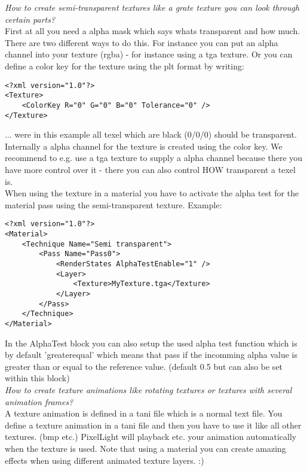 \emph{How to create semi-transparent textures like a grate texture you can look through certain parts?}\\
First at all you need a alpha mask which says whats transparent and how much.
There are two different ways to do this. For instance you can put an alpha channel into your
texture (rgba) - for instance using a tga texture. Or you can define a color key for the texture
using the plt format by writing:\\

\begin{lstlisting}[caption=plt-file color key]
<?xml version="1.0"?>
<Texture>
	<ColorKey R="0" G="0" B="0" Tolerance="0" />
</Texture>
\end{lstlisting}

... were in this example all texel which are black (0/0/0) should be transparent. Internally a
alpha channel for the texture is created using the color key. We recommend to e.g. use a tga
texture to supply a alpha channel because there you have more control over it - there you can
also control HOW transparent a texel is.\\
    
When using the texture in a material you have to activate the alpha test for the material pass
using the semi-transparent texture. Example:\\

\begin{lstlisting}[caption=Semi-transparent material]
<?xml version="1.0"?>
<Material>
	<Technique Name="Semi transparent">
		<Pass Name="Pass0">
			<RenderStates AlphaTestEnable="1" />
			<Layer>
				<Texture>MyTexture.tga</Texture>
			</Layer>
		</Pass>
	</Technique>
</Material>
\end{lstlisting}

In the AlphaTest block you can also setup the used alpha test function which is by default 'greaterequal' 
which means that pass if the incomming alpha value is greater than or equal to the reference value.
(default 0.5 but can also be set within this block)\\


\emph{How to create texture animations like rotating textures or textures with several animation frames?}\\
A texture animation is defined in a tani file which is a normal text file. You define a texture
animation in a tani file and then you have to use it like all other textures. (bmp etc.) PixelLight
will playback etc. your animation automatically when the texture is used. Note that using a material
you can create amazing effects when using different animated texture layers. :)\\


